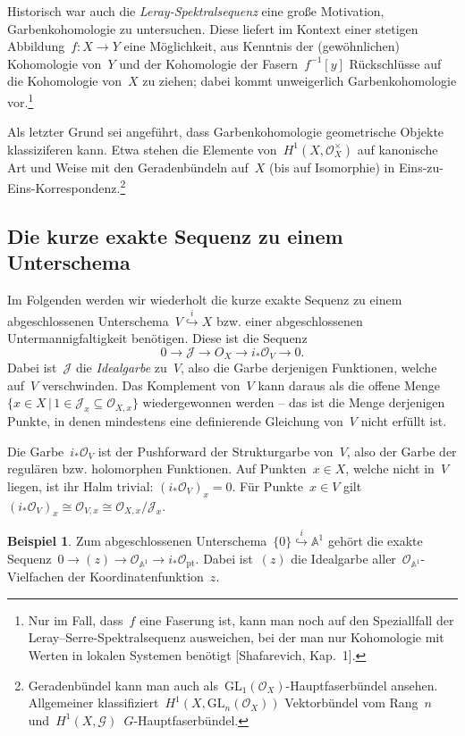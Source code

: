 \documentclass[a4paper,ngerman,12pt]{scrartcl}
\theoremstyle{definition}
\newtheorem{ex}[defn]{Beispiel}
\theoremstyle{plain}
\theoremstyle{remark}
\renewcommand{\AA}{\mathbb{A}}
\newcommand{\G}{\mathcal{G}}
\newcommand{\J}{\mathcal{J}}
\renewcommand{\O}{\mathcal{O}}
\newcommand{\GL}{\mathrm{GL}}
\newcommand{\pt}{\mathrm{pt}}
\newcommand{\lra}{\longrightarrow}
\begin{document}
Historisch war auch die \emph{Leray-Spektralsequenz} eine große Motivation,
Garbenkohomologie zu untersuchen. Diese liefert im Kontext einer stetigen
Abbildung~$f : X \to Y$ eine Möglichkeit, aus Kenntnis der (gewöhnlichen)
Kohomologie von~$Y$ und der Kohomologie der Fasern~$f^{-1}[y]$ Rückschlüsse auf die Kohomologie
von~$X$ zu ziehen; dabei kommt unweigerlich Garbenkohomologie vor.\footnote{Nur
im Fall, dass~$f$ eine Faserung ist, kann man noch auf den Speziallfall der
Leray--Serre-Spek\-tral\-sequenz ausweichen, bei der man nur Kohomologie mit Werten
in lokalen Systemen benötigt [Shafarevich, Kap.~1].}

Als letzter Grund sei angeführt, dass Garbenkohomologie geometrische Objekte
klassiziferen kann. Etwa stehen die Elemente von~$H^1(X,\O_X^\times)$ auf
kanonische Art und Weise mit den Geradenbündeln auf~$X$ (bis auf Isomorphie) in
Eins-zu-Eins-Korrespondenz.\footnote{Geradenbündel kann man auch
als~$\GL_1(\O_X)$-Hauptfaserbündel ansehen. Allgemeiner
klassifiziert~$H^1(X,\GL_n(\O_X))$ Vektorbündel vom Rang~$n$
und~$H^1(X,\G)$~$G$-Hauptfaserbündel.}


\subsection*{Die kurze exakte Sequenz zu einem Unterschema}

Im Folgenden werden wir wiederholt die kurze exakte Sequenz zu einem
abgeschlossenen Unterschema~$V \stackrel{i}{\hookrightarrow} X$ bzw. einer
abgeschlossenen Untermannigfaltigkeit benötigen. Diese ist die Sequenz
\[ 0 \lra \J \lra O_X \lra i_*\O_V \lra 0. \]
Dabei ist~$\J$ die \emph{Idealgarbe} zu~$V$, also die Garbe derjenigen
Funktionen, welche auf~$V$ verschwinden. Das Komplement von~$V$ kann daraus als
die offene Menge~$\{ x \in X \,|\, 1 \in \J_x \subseteq \O_{X,x} \}$
wiedergewonnen werden -- das ist die Menge derjenigen Punkte, in denen
mindestens eine definierende Gleichung von~$V$ nicht erfüllt ist.

Die Garbe~$i_* \O_V$ ist der Pushforward der Strukturgarbe von~$V$, also der
Garbe der regulären bzw. holomorphen Funktionen. Auf Punkten~$x \in X$, welche
nicht in~$V$ liegen, ist ihr Halm trivial: $(i_*\O_V)_x = 0$. Für Punkte~$x \in
V$ gilt~$(i_*\O_V)_x \cong \O_{V,x} \cong \O_{X,x}/\J_x$.

\begin{ex}Zum abgeschlossenen Unterschema~$\{0\} \stackrel{i}{\hookrightarrow} \AA^1$ gehört
die exakte Sequenz~$0 \to (z) \to \O_{\AA^1} \to i_*\O_\pt$. Dabei ist~$(z)$ die
Idealgarbe aller~$\O_{\AA^1}$-Vielfachen der Koordinatenfunktion~$z$.\end{ex}
\end{document}
